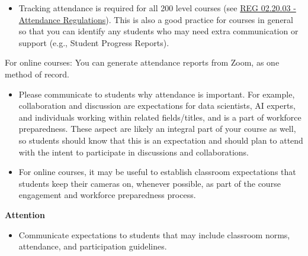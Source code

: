 \documentclass[
  letterpaper,
  DIV=11,
  numbers=noendperiod]{scrreprt}
\providecommand{\tightlist}{%
  \setlength{\itemsep}{0pt}\setlength{\parskip}{0pt}}
\begin{document}
\begin{itemize}
\tightlist
\item
  Tracking attendance is required for all 200 level courses (see
  \href{https://policies.ncsu.edu/regulation/reg-02-20-03-attendance-regulations/}{REG
  02.20.03 - Attendance Regulations}). This is also a good practice for
  courses in general so that you can identify any students who may need
  extra communication or support (e.g., Student Progress Reports).
\end{itemize}

For online courses: You can generate attendance reports from Zoom, as
one method of record.

\begin{itemize}
\item
  Please communicate to students why attendance is important. For
  example, collaboration and discussion are expectations for data
  scientists, AI experts, and individuals working within related
  fields/titles, and is a part of workforce preparedness. These aspect
  are likely an integral part of your course as well, so students should
  know that this is an expectation and should plan to attend with the
  intent to participate in discussions and collaborations.
\item
  For online courses, it may be useful to establish classroom
  expectations that students keep their cameras on, whenever possible,
  as part of the course engagement and workforce preparedness process.
\end{itemize}

\begin{tcolorbox}[enhanced jigsaw, toprule=.15mm, colback=white, arc=.35mm, colframe=quarto-callout-note-color-frame, bottomrule=.15mm, rightrule=.15mm, breakable, leftrule=.75mm, left=2mm, opacityback=0]
\begin{minipage}[t]{5.5mm}
\textcolor{quarto-callout-note-color}{\faInfo}
\end{minipage}%
\begin{minipage}[t]{\textwidth - 5.5mm}

\vspace{-3mm}\textbf{{Attention}}\vspace{3mm}

\begin{itemize}
\tightlist
\item
  {Communicate expectations to students that may include classroom
  norms, attendance, and participation guidelines.}
\end{itemize}

\end{minipage}%
\end{tcolorbox}
\end{document}
